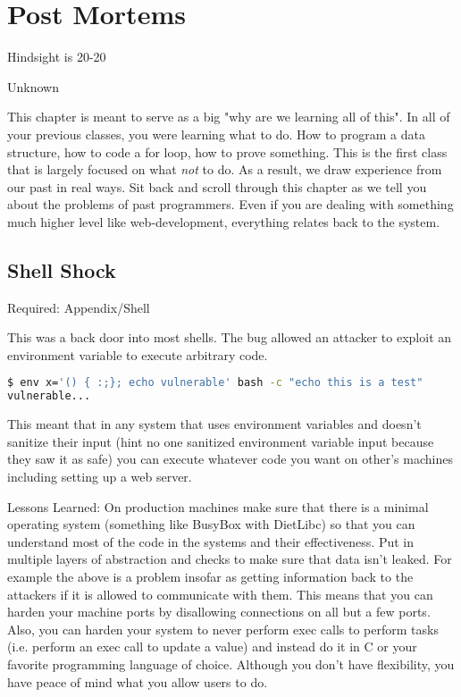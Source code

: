 \chapter{Post Mortems}

\epigraph{Hindsight is 20-20}{Unknown}

This chapter is meant to serve as a big "why are we learning all of this".
In all of your previous classes, you were learning what to do.
How to program a data structure, how to code a for loop, how to prove something.
This is the first class that is largely focused on what \textit{not} to do.
As a result, we draw experience from our past in real ways.
Sit back and scroll through this chapter as we tell you about the problems of past programmers.
Even if you are dealing with something much higher level like web-development, everything relates back to the system.

\section{Shell Shock}

Required: Appendix/Shell

This was a back door into most shells.
The bug allowed an attacker to exploit an environment variable to execute arbitrary code.

\begin{lstlisting}[language=bash]
$ env x='() { :;}; echo vulnerable' bash -c "echo this is a test"
vulnerable...
\end{lstlisting}

This meant that in any system that uses environment variables and doesn't sanitize their input (hint no one sanitized environment variable input because they saw it as safe) you can execute whatever code you want on other's machines including setting up a web server.

Lessons Learned: On production machines make sure that there is a minimal operating system (something like BusyBox with DietLibc) so that you can understand most of the code in the systems and their effectiveness.
Put in multiple layers of abstraction and checks to make sure that data isn't leaked.
For example the above is a problem insofar as getting information back to the attackers if it is allowed to communicate with them.
This means that you can harden your machine ports by disallowing connections on all but a few ports.
Also, you can harden your system to never perform exec calls to perform tasks (i.e. perform an exec call to update a value) and instead do it in C or your favorite programming language of choice.
Although you don't have flexibility, you have peace of mind what you allow users to do.

